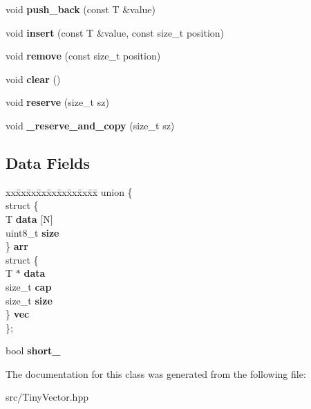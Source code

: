 \begin{DoxyCompactItemize}
void {\bfseries push\+\_\+back} (const T \&value)
\item 
\mbox{\label{classtiny__vector_a822d3bcd80db87efc0f12e51d278f098}} 
void {\bfseries insert} (const T \&value, const size\+\_\+t position)
\item 
\mbox{\label{classtiny__vector_aea3d8e10d334d60f243bf5bfa436d5c4}} 
void {\bfseries remove} (const size\+\_\+t position)
\item 
\mbox{\label{classtiny__vector_ab0c497ff54fce376e34986611634d372}} 
void {\bfseries clear} ()
\item 
\mbox{\label{classtiny__vector_ad2cf38e90a121a702b0321162462e0f7}} 
void {\bfseries reserve} (size\+\_\+t sz)
\item 
\mbox{\label{classtiny__vector_aa7e107c8a723ea1d37635ccd84acd88c}} 
void {\bfseries \+\_\+reserve\+\_\+and\+\_\+copy} (size\+\_\+t sz)
\end{DoxyCompactItemize}
\subsection*{Data Fields}
\begin{DoxyCompactItemize}
\item 
\mbox{\label{classtiny__vector_ad0b241536022d75bc75b684dd29f83ca}} 
\begin{tabbing}
xx\=xx\=xx\=xx\=xx\=xx\=xx\=xx\=xx\=\kill
union \{\\
\>struct \{\\
\>\>T {\bfseries data} \mbox{[}N\mbox{]}\\
\>\>uint8\_t {\bfseries size}\\
\>\} {\bfseries arr}\\
\>struct \{\\
\>\>T $\ast$ {\bfseries data}\\
\>\>size\_t {\bfseries cap}\\
\>\>size\_t {\bfseries size}\\
\>\} {\bfseries vec}\\
\}; \\

\end{tabbing}\item 
\mbox{\label{classtiny__vector_a3a48500938473ac1aa6c3cd4cfa54712}} 
bool {\bfseries short\+\_\+}
\end{DoxyCompactItemize}


The documentation for this class was generated from the following file\+:\begin{DoxyCompactItemize}
\item 
src/Tiny\+Vector.\+hpp\end{DoxyCompactItemize}
